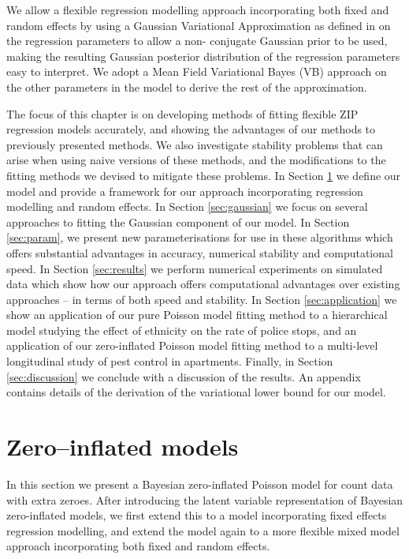We allow a flexible regression modelling approach incorporating both fixed and random effects by using a
Gaussian Variational Approximation as defined in \cite{Ormerod2012} on the regression parameters to allow a
non- conjugate Gaussian prior to be used, making the resulting Gaussian posterior distribution of the
regression parameters easy to interpret. We adopt a Mean Field  Variational Bayes (VB) approach on the other
parameters in the model to derive the rest of the approximation.

The focus of this chapter is on developing methods of fitting flexible ZIP regression models accurately, and
showing the advantages of our methods to previously presented methods. We also investigate stability problems
that can arise when using naive versions of these methods, and the modifications to the fitting methods we
devised to mitigate these problems. In Section \ref{sec:model} we define our model and provide a framework for
our approach incorporating regression modelling and random effects. In Section \ref{sec:gaussian} we focus on
several approaches to fitting the Gaussian component of our model. In Section \ref{sec:param}, we present new
parameterisations for use in these algorithms which offers substantial advantages in accuracy, numerical
stability and computational speed. In Section \ref{sec:results} we perform numerical experiments on simulated
data which show how our approach offers computational advantages over existing approaches -- in terms of both
speed and stability. In Section \ref{sec:application} we show an application of our pure Poisson model fitting
method to a hierarchical model studying the effect of ethnicity on the rate of police stops, and an
application of our zero-inflated Poisson model fitting method to a multi-level longitudinal study of pest
control in apartments. Finally, in Section \ref{sec:discussion} we conclude with a discussion of the results.
An appendix contains details of the derivation of the variational lower bound for our model.

\section{Zero--inflated models}
\label{sec:model}

In this section we present a Bayesian zero-inflated Poisson model for count data with extra zeroes. After
introducing the latent variable representation of Bayesian zero-inflated models, we first extend this to a
model incorporating fixed effects regression modelling, and extend the model again to a more flexible mixed
model approach incorporating both fixed and random effects.

